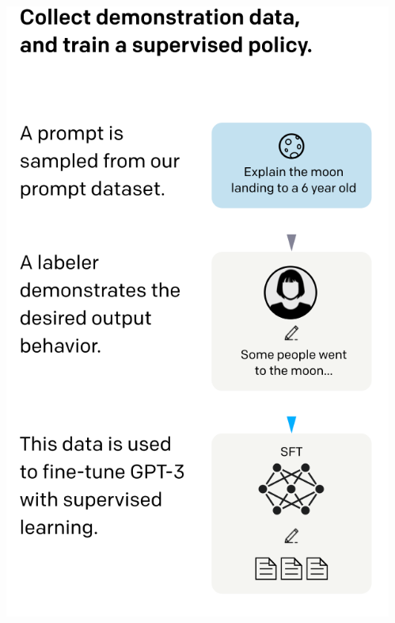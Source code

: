 \documentclass[usenames,dvipsnames,notes,11pt,aspectratio=169,hyperref={colorlinks=true, linkcolor=blue}]{beamer}
\begin{document}
\begin{frame}
\begin{columns}
\begin{column}{0.6\textwidth}
\begin{itemize}
            \end{itemize}
        \end{column}
        \begin{column}{0.4\textwidth}
        \includegraphics[width=\textwidth]{figures/sft}
        \end{column}
    \end{columns}
\end{frame}
\end{document}
